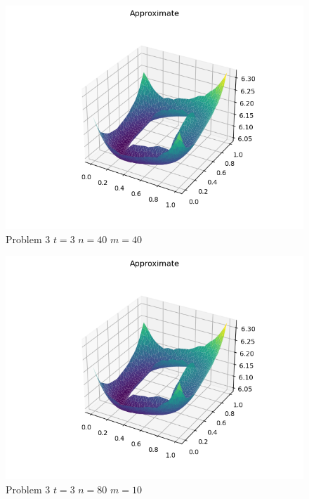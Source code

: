 \documentclass{report}
\begin{document}
\begin{figure}[h]
	\caption{Problem 3 $t = 3$ $n = 40$ $m = 40$}
	\includegraphics[width=\textwidth]{example.png}
\end{figure}
\begin{figure}[h]
	\caption{Problem 3 $t = 3$ $n = 80$ $m = 10$}
	\includegraphics[width=\textwidth]{example.png}
\end{figure}
\end{document}
